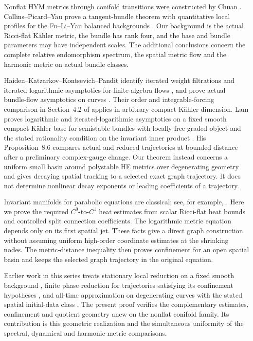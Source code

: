 Nonflat HYM metrics through conifold transitions were
constructed by Chuan \cite{Chuan}. Collins--Picard--Yau
prove a tangent-bundle theorem with quantitative local
profiles for the Fu--Li--Yau balanced backgrounds
\cite[Theorem 1.1]{CPY}. Our background is the actual
Ricci-flat Kähler metric, the bundle has rank four,
and the base and bundle parameters may have independent
scales. The additional conclusions concern the complete
relative endomorphism spectrum, the spatial metric
flow and the harmonic metric on actual bundle classes.

Haiden--Katzarkov--Kontsevich--Pandit identify iterated
weight filtrations and iterated-logarithmic asymptotics
for finite algebra flows \cite{HKKPweights}, and prove
actual bundle-flow asymptotics on curves
\cite[Theorem 1.1]{HKKPflows}. Their order and
integrable-forcing comparison in Section~4.2 of
\cite{HKKPflows} applies in arbitrary compact Kähler
dimension. Lam proves logarithmic and iterated-logarithmic
asymptotics on a fixed smooth compact Kähler base for
semistable bundles with locally free graded object and
the stated rationality condition on the invariant inner
product \cite[Theorem 8.2]{Lam}. His Proposition~8.6
compares actual and reduced trajectories at bounded
distance after a preliminary complex-gauge change.
Our theorem instead concerns a uniform small basin
around polystable HE metrics over degenerating geometry
and gives decaying spatial tracking to a selected exact
graph trajectory. It does not determine nonlinear
decay exponents or leading coefficients of a trajectory.

Invariant manifolds for parabolic equations are classical;
see, for example, \cite[Theorem 2.1]{Simonett}.
Here we prove the required $C^0$-to-$C^1$ heat estimates
from scalar Ricci-flat heat bounds and controlled split
connection coefficients. The logarithmic metric equation
depends only on its first spatial jet. These facts give
a direct graph construction without assuming uniform
high-order coordinate estimates at the shrinking nodes.
The metric-distance inequality then proves confinement
for an open spatial basin and keeps the selected graph
trajectory in the original equation.

Earlier work in this series treats stationary local
reduction on a fixed smooth background \cite{W_Local},
finite phase reduction for trajectories satisfying its
confinement hypotheses \cite{W_Phase}, and all-time
approximation on degenerating curves with the stated
spatial initial-data class \cite{W_Curves}.
The present proof verifies the complementary estimates,
confinement and quotient geometry anew on the nonflat
conifold family. Its contribution is this geometric
realization and the simultaneous uniformity of the
spectral, dynamical and harmonic-metric comparisons.

